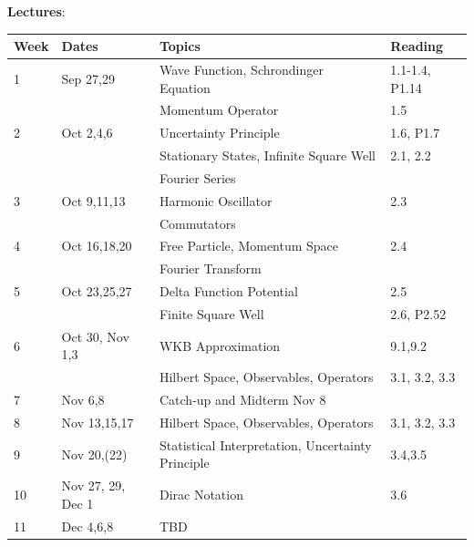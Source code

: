 \documentclass[12pt]{article}
\begin{document}
\noindent
\textbf {Lectures}:\\

\noindent
\begin{tabular}{llll}
\textbf{Week} & \textbf{Dates} & \textbf{Topics} & \textbf{Reading} \\
\hline
1  & Sep 27,29         & Wave Function, Schrondinger Equation & 1.1-1.4, P1.14 \\
   &                   & Momentum Operator  & 1.5 \\
\hline
2  & Oct 2,4,6         & Uncertainty Principle & 1.6, P1.7 \\
   &                   & Stationary States, Infinite Square Well & 2.1, 2.2 \\
   &                   & Fourier Series   & \\
\hline
3  & Oct 9,11,13       & Harmonic Oscillator & 2.3 \\
   &                   & Commutators         &   \\
\hline
4  & Oct 16,18,20      & Free Particle, Momentum Space & 2.4 \\
   &                   & Fourier Transform  &  \\
\hline
5  & Oct 23,25,27      & Delta Function Potential & 2.5 \\
   &                   & Finite Square Well & 2.6, P2.52\\
\hline
6  & Oct 30, Nov 1,3   & WKB Approximation & 9.1,9.2 \\
   &                   & Hilbert Space, Observables, Operators & 3.1, 3.2, 3.3\\
\hline
7  & Nov 6,8           & Catch-up and Midterm Nov 8 \\
\hline
8  & Nov 13,15,17      & Hilbert Space, Observables, Operators & 3.1, 3.2, 3.3\\
\hline
9  & Nov 20,(22)       & Statistical Interpretation, Uncertainty Principle & 3.4,3.5\\
\hline
10  & Nov 27, 29, Dec 1 & Dirac Notation & 3.6 \\
\hline
11 & Dec 4,6,8         & TBD \\
\hline
\end{tabular}\\ \vskip 1cm
\end{document}
